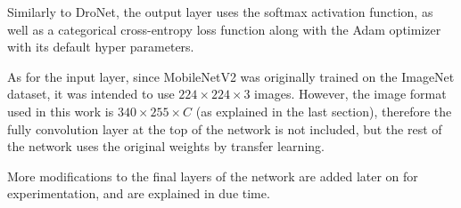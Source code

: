 Similarly to DroNet, the output layer uses the softmax activation function, as
well as a categorical cross-entropy loss function along with the Adam optimizer
with its default hyper parameters.

As for the input layer, since MobileNetV2 was originally trained on the
ImageNet dataset, it was intended to use $224\times224\times3$ images. However,
the image format used in this work is $340\times255\times C$ (as explained in
the last section), therefore the fully convolution layer at the top of the
network is not included, but the rest of the network uses the original weights
by transfer learning.

More modifications to the final layers of the network are added later on for
experimentation, and are explained in due time.

